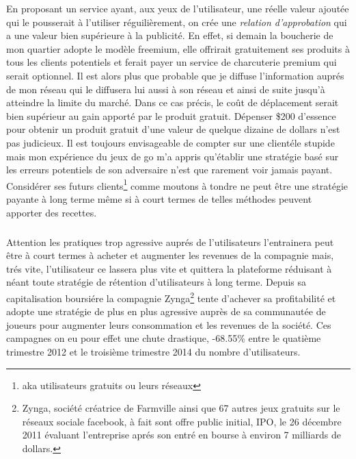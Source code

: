 \documentclass[11pt, a4paper ]{article}
\begin{document}
\begin{spacing}{1.5}
En proposant un service ayant, aux yeux de l'utilisateur, une réelle valeur ajoutée qui le pousserait à l'utiliser réguilièrement, on crée une \emph{relation d'approbation} qui a une valeur bien supérieure à la publicité.
En effet, si demain la boucherie de mon quartier adopte le modèle freemium, elle offrirait gratuitement ses produits à tous les clients potentiels et ferait payer un service de charcuterie premium qui serait optionnel.
Il est alors plus que probable que je diffuse l'information auprés de mon réseau qui le diffusera lui aussi à son réseau et ainsi de suite jusqu'à atteindre la limite du marché. Dans ce cas précis, le coût de déplacement serait bien supérieur au gain apporté par le produit gratuit.
Dépenser \$200 d'essence pour obtenir un produit gratuit d'une valeur de quelque dizaine de dollars n'est pas judicieux. Il est toujours envisageable de compter sur une clientéle stupide mais mon expérience du jeux de go m'a appris qu'établir une stratégie basé sur les erreurs potentiels de son adversaire n'est que rarement voir jamais payant.
Considérer ses futurs clients\footnote{aka utilisateurs gratuits ou leurs réseaux} comme moutons à tondre ne peut être une stratégie payante à long terme même si à court termes de telles méthodes peuvent apporter des recettes.
\subparagraph{}
Attention les pratiques trop agressive auprés de l'utilisateurs l'entrainera peut être à court termes à acheter et augmenter les revenues de la compagnie mais, trés vite, l'utilisateur ce lassera plus vite et quittera la plateforme réduisant à néant toute stratégie de rétention d'utilisateurs à long terme. Depuis sa capitalisation boursiére la compagnie Zynga\footnote{Zynga, société créatrice de Farmville ainsi que 67 autres jeux gratuits sur le réseaux sociale facebook, à fait sont offre public initial, IPO, le 26 décembre 2011 évaluant l'entreprise aprés son entré en bourse à environ 7 milliards de dollars.\cite{ipoZynga}} tente d'achever sa profitabilité et adopte une stratégie de plus en plus agressive auprès de sa communautée de joueurs pour augmenter leurs consommation et les revenues de la société. Ces campagnes on eu pour effet une chute drastique, -68.55\% entre le quatième trimestre 2012 et le troisième trimestre 2014 du nombre d'utilisateurs.


\end{spacing}
\end{document}
